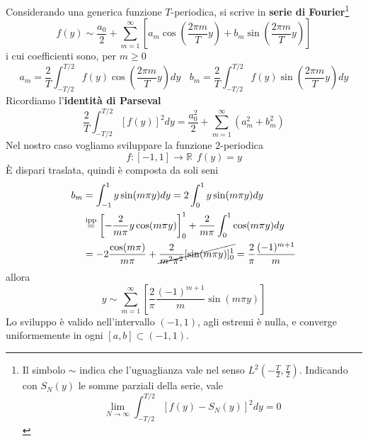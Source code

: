 \documentclass[10pt,a4paper,twoside,openright]{book}
\begin{document}
Considerando una generica funzione $T$-periodica, si scrive in \textbf{serie di Fourier}\footnote{Il simbolo $\sim $ indica che l'uguaglianza vale nel senso $L^{2}\left( -\frac{T}{2},\frac{T}{2}\right)$. Indicando con $S_{N}(y)$ le somme parziali della serie, vale
\begin{equation*}
\lim _{N\rightarrow \infty }\int ^{T/2}_{-T/2}[ f(y) -S_{N}(y)]^{2} dy=0
\end{equation*}}
\begin{equation*}
f(y) \sim \frac{a_{0}}{2} +\sum\limits ^{\infty }_{m=1}\left[ a_{m}\cos\left(\frac{2\pi m}{T} y\right) +b_{m}\sin\left(\frac{2\pi m}{T} y\right)\right]
\end{equation*}
i cui coefficienti sono, per $m\geqslant 0$
\begin{equation*}
a_{m} =\frac{2}{T}\int ^{T/2}_{-T/2} f(y)\cos\left(\frac{2\pi m}{T} y\right) dy\ \ \ \ b_{m} =\frac{2}{T}\int ^{T/2}_{-T/2} f(y)\sin\left(\frac{2\pi m}{T} y\right) dy
\end{equation*}
Ricordiamo l'\textbf{identità di Parseval}
\begin{equation*}
\frac{2}{T}\int ^{T/2}_{-T/2}[ f(y)]^{2} dy=\frac{a^{2}_{0}}{2} +\sum\limits ^{\infty }_{m=1}\left( a^{2}_{m} +b^{2}_{m}\right)
\end{equation*}
Nel nostro caso vogliamo sviluppare la funzione $2$-periodica
\begin{equation*}
f:[ -1,1]\rightarrow \mathbb{R} \ \ f(y) =y
\end{equation*}
È dispari traslata, quindi è composta da soli seni
\begin{align*}
b_{m} & =\int ^{1}_{-1} y\sin(m\pi y) dy=2\int ^{1}_{0} y\sin(m\pi y) dy\\
 & \overset{\text{ipp}}{=}\left[ -\frac{2}{m\pi } y\cos(m\pi y)\right]^{1}_{0} +\frac{2}{m\pi }\int ^{1}_{0}\cos(m\pi y) dy\\
 & =-2\frac{\cos(m\pi)}{m\pi } +\cancel{\frac{2}{m^{2} \pi ^{2}}[\sin(m\pi y)]^{1}_{0}} =\frac{2}{\pi }\frac{(-1)^{m+1}}{m}
\end{align*}
allora
\begin{equation}
y\sim \sum\limits ^{\infty }_{m=1}\left[\frac{2}{\pi }\frac{(-1)^{m+1}}{m}\sin(m\pi y)\right]
\label{eq:diff-y-fourier}
\end{equation}
Lo sviluppo è valido nell'intervallo $(-1,1)$, agli estremi è nulla, e converge uniformemente in ogni $[ a,b] \subset (-1,1)$.
\end{document}
